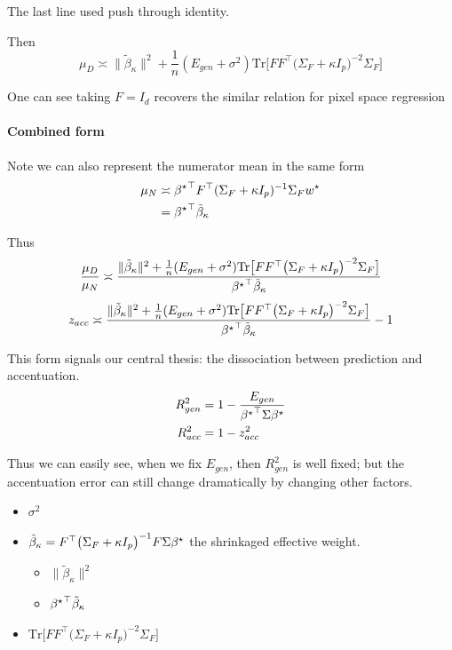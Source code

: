 The last line used push through identity.

Then
\[
\mu_{D}\asymp\|\tilde{\beta}_{\kappa}\|^{2}+\frac{1}{n}(E_{gen}+\sigma^{2})\mbox{Tr}\bigl[FF^{\top}\bigl(\Sigma_{F}+\kappa I_{p}\bigr)^{-2}\Sigma_{F}\bigr]
\]

One can see taking $F=I_{d}$ recovers the similar relation for pixel
space regression


\paragraph{Combined form}

Note we can also represent the numerator mean in the same form
\begin{align*}
\mu_{N} & \asymp{{\beta^{\star}}}^{\top}F^{\top}(\Sigma_{F}+\kappa I_{p})^{-1}\Sigma_{F}w^{\star}\\
 & ={{\beta^{\star}}}^{\top}\tilde{\beta}_{\kappa}
\end{align*}

Thus
\[
\frac{\mu_{D}}{\mu_{N}}\asymp\frac{\|\tilde{\beta}_{\kappa}\|^{2}+\frac{1}{n}(E_{gen}+\sigma^{2})\mbox{Tr}\bigl[FF^{\top}\bigl(\Sigma_{F}+\kappa I_{p}\bigr)^{-2}\Sigma_{F}\bigr]}{{{\beta^{\star}}}^{\top}\tilde{\beta}_{\kappa}}
\]
\[
z_{acc}\asymp\frac{\|\tilde{\beta}_{\kappa}\|^{2}+\frac{1}{n}(E_{gen}+\sigma^{2})\mbox{Tr}\bigl[FF^{\top}\bigl(\Sigma_{F}+\kappa I_{p}\bigr)^{-2}\Sigma_{F}\bigr]}{{{\beta^{\star}}}^{\top}\tilde{\beta}_{\kappa}}-1
\]

This form signals our central thesis: the dissociation between prediction
and accentuation.
\begin{align*}
R_{gen}^{2} & =1-\frac{E_{gen}}{{{\beta^{\star}}}^{\top}\Sigma{\beta^{\star}}}\\
R_{acc}^{2} & =1-z_{acc}^{2}
\end{align*}

Thus we can easily see, when we fix $E_{gen}$, then $R_{gen}^{2}$
is well fixed; but the accentuation error can still change dramatically
by changing other factors.
\begin{itemize}
\item $\sigma^{2}$
\item $\tilde{\beta}_{\kappa}=F^{\top}\bigl(\Sigma_{F}+\kappa I_{p}\bigr)^{-1}F\Sigma{\beta^{\star}}$
the shrinkaged effective weight.
\begin{itemize}
\item $\|\tilde{\beta}_{\kappa}\|^{2}$
\item ${{\beta^{\star}}}^{\top}\tilde{\beta}_{\kappa}$
\end{itemize}
\item $\mbox{Tr}\bigl[FF^{\top}\bigl(\Sigma_{F}+\kappa I_{p}\bigr)^{-2}\Sigma_{F}\bigr]$
\end{itemize}

